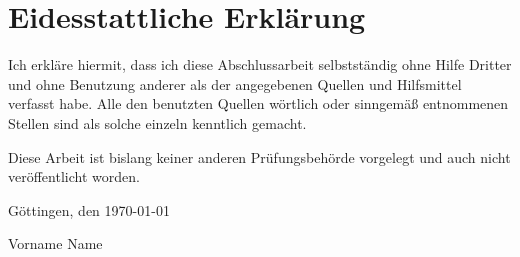 

\clearpage
\thispagestyle{empty}
{}
\section*{Eidesstattliche Erklärung}

\smallskip
Ich erkläre hiermit, dass ich diese Abschlussarbeit selbstständig ohne Hilfe Dritter und ohne Benutzung anderer als der angegebenen Quellen und Hilfsmittel verfasst habe. Alle den benutzten Quellen wörtlich oder sinngemäß entnommenen Stellen sind als solche einzeln kenntlich gemacht.

\smallskip
\noindent
Diese Arbeit ist bislang keiner anderen Prüfungsbehörde vorgelegt und auch nicht veröffentlicht worden.

\bigskip
\noindent
Göttingen, den \today

\vspace{4em}
Vorname Name

